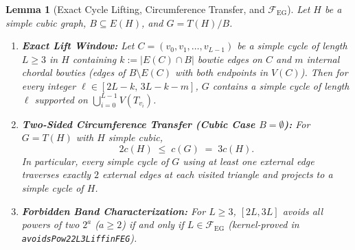 \documentclass[11pt,reqno]{amsart}
\theoremstyle{plain}
\newtheorem{lemma}[theorem]{Lemma}
\theoremstyle{definition}
\theoremstyle{remark}
\newcommand{\FEG}{\mathcal{F}_{\mathrm{EG}}}
\DeclareRobustCommand{\_}{\ifmmode\text{\textunderscore}\else\textunderscore\allowbreak\fi}
\begin{document}
\begin{lemma}[Exact Cycle Lifting, Circumference Transfer, and $\FEG$]\label{lem:lift}
Let $H$ be a simple cubic graph, $B \subseteq E(H)$, and $G = T(H)/B$.
\begin{enumerate}[label=(\roman*),leftmargin=2.2em]
  \item \textbf{Exact Lift Window:} Let $C = (v_0, v_1, \dots, v_{L-1})$ be a simple cycle of length $L \ge 3$ in $H$ containing $k := |E(C) \cap B|$ bowtie edges on $C$ and $m$ internal chordal bowties (edges of $B \setminus E(C)$ with both endpoints in $V(C)$). Then for every integer $\ell \in [2L - k,\, 3L - k - m]$, $G$ contains a simple cycle of length $\ell$ supported on $\bigcup_{i=0}^{L-1} V(T_{v_i})$.
  \item \textbf{Two-Sided Circumference Transfer (Cubic Case $B = \emptyset$):} For $G = T(H)$ with $H$ simple cubic,
  \[
    2 c(H) \;\le\; c(G) \;=\; 3 c(H).
  \]
  In particular, every simple cycle of $G$ using at least one external edge traverses exactly $2$ external edges at each visited triangle and projects to a simple cycle of $H$.
  \item \textbf{Forbidden Band Characterization:} For $L \ge 3$, $[2L, 3L]$ avoids all powers of two $2^a$ ($a \ge 2$) if and only if $L \in \FEG$ (kernel-proved in \texttt{avoidsPow2\_2L\_3L\_iff\_inFEG}).
\end{enumerate}
\end{lemma}
\end{document}
